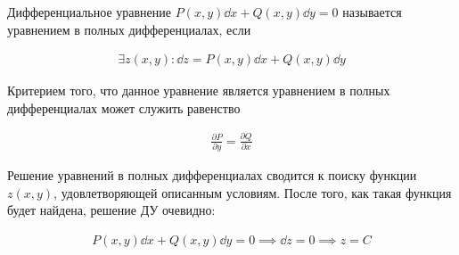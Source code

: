 
\begin{definition}
  Дифференциальное уравнение \(P(x, y) \dd x + Q(x, y) \dd y = 0\) называется
  уравнением в полных дифференциалах, если
  
  \begin{align*}
    \exists z(x, y) \colon \dd z = P(x, y) \dd x + Q(x, y) \dd y
  \end{align*}
\end{definition}

Критерием того, что данное уравнение является уравнением в полных
дифференциалах может служить равенство

\begin{align*}
  \frac{\partial P}{\partial y} = \frac{\partial Q}{\partial x} 
\end{align*}

Решение уравнений в полных дифференциалах сводится к поиску функции \(z(x, y)\),
удовлетворяющей описанным условиям. После того, как такая функция будет найдена,
решение ДУ очевидно:

\begin{align*}
  P(x, y) \dd x + Q(x, y) \dd y = 0
  \implies \dd z = 0
  \implies z = C
\end{align*}

